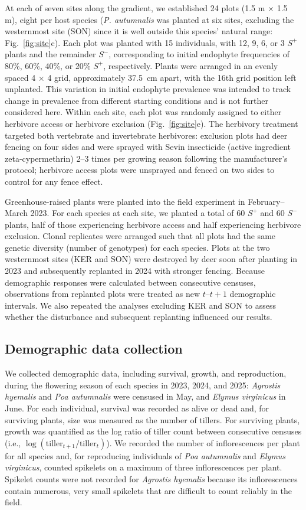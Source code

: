 \documentclass[12pt]{article}\usepackage[]{graphicx}\usepackage[dvipsnames]{xcolor}
\begin{document}
At each of seven sites along the gradient, we established 24 plots (1.5 m $\times$ 1.5 m), eight per host species (\textit{P. autumnalis} was planted at six sites, excluding the westernmost site (SON) since it is well outside this species' natural range: Fig.~\ref{fig:site}c).
Each plot was planted with 15 individuals, with 12, 9, 6, or 3 $S^+$ plants and the remainder $S^-$, corresponding to initial endophyte frequencies of 80\%, 60\%, 40\%, or 20\% $S^+$, respectively.
Plants were arranged in an evenly spaced 4 $\times$ 4 grid, approximately 37.5~cm apart, with the 16th grid position left unplanted.
This variation in initial endophyte prevalence was intended to track change in prevalence from different starting conditions and is not further considered here.
Within each site, each plot was randomly assigned to either herbivore access or herbivore exclusion (Fig.~\ref{fig:site}e).
The herbivory treatment targeted both vertebrate and invertebrate herbivores: exclusion plots had deer fencing on four sides and were sprayed with Sevin insecticide (active ingredient zeta-cypermethrin) 2--3 times per growing season following the manufacturer's protocol; herbivore access plots were unsprayed and fenced on two sides to control for any fence effect.

Greenhouse-raised plants were planted into the field experiment in February--March 2023.
For each species at each site, we planted a total of 60 $S^+$ and 60 $S^-$ plants, half of those experiencing herbivore access and half experiencing herbivore exclusion. 
Clonal replicates were arranged such that all plots had the same genetic diversity (number of genotypes) for each species. 
Plots at the two westernmost sites (KER and SON) were destroyed by deer soon after planting in 2023 and subsequently replanted in 2024 with stronger fencing.
Because demographic responses were calculated between consecutive censuses, observations from replanted plots were treated as new $t$--$t+1$ demographic intervals. We also repeated the analyses excluding KER and SON to assess whether the disturbance and subsequent replanting influenced our results.


\subsection*{Demographic data collection}
We collected demographic data, including survival, growth, and reproduction, during the flowering season of each species in 2023, 2024, and 2025: \emph{Agrostis hyemalis} and \emph{Poa autumnalis} were censused in May, and \emph{Elymus virginicus} in June.
For each individual, survival was recorded as alive or dead and, for surviving plants, size was measured as the number of tillers.
For surviving plants, growth was quantified as the log ratio of tiller count between consecutive censuses (i.e., $\log(\text{tiller}_{t+1}/\text{tiller}_{t})$).
We recorded the number of inflorescences per plant for all species and, for reproducing individuals of \emph{Poa autumnalis} and \emph{Elymus virginicus}, counted spikelets on a maximum of three inflorescences per plant. Spikelet counts were not recorded for \emph{Agrostis hyemalis} because its inflorescences contain numerous, very small spikelets that are difficult to count reliably in the field. 
\end{document}
